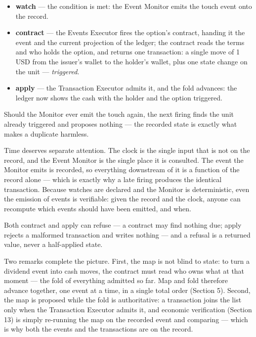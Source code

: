 \documentclass[11pt,a4paper]{article}
\newcommand{\clabel}[1]{\leavevmode\hypertarget{clause-#1}{}%
  \marginpar{\raggedright\scriptsize\ttfamily\textcolor{gray}{#1}}}
\providecommand{\tightlist}{\setlength{\itemsep}{2pt}\setlength{\parskip}{0pt}}
\begin{document}
\begin{itemize}
\tightlist
\item
  \textbf{watch} --- the condition is met: the Event Monitor emits the
  touch event onto the record.
\item
  \textbf{contract} --- the Events Executor fires the option's contract,
  handing it the event and the current projection of the ledger; the
  contract reads the terms and who holds the option, and returns one
  transaction: a single move of 1 USD from the issuer's wallet to the
  holder's wallet, plus one state change on the unit ---
  \emph{triggered}.
\item
  \textbf{apply} --- the Transaction Executor admits it, and the fold
  advances: the ledger now shows the cash with the holder and the option
  triggered.
\end{itemize}

Should the Monitor ever emit the touch again, the next firing finds the
unit already triggered and proposes nothing --- the recorded state is
exactly what makes a duplicate harmless.

Time deserves separate attention. \clabel{C-3.7}The clock is the single input that is
not on the record, and the Event Monitor is the single place it is
consulted. The event the Monitor emits is recorded, so everything
downstream of it is a function of the record alone --- which is exactly
why a late firing produces the identical transaction. Because watches
are declared and the Monitor is deterministic, even the emission of
events is verifiable: given the record and the clock, anyone can
recompute which events should have been emitted, and when.

\clabel{C-3.8}Both contract and apply can refuse --- a contract may find nothing due;
apply rejects a malformed transaction and writes nothing --- and a
refusal is a returned value, never a half-applied state.

Two remarks complete the picture. First, the map is not blind to state:
to turn a dividend event into cash moves, the contract must read who
owns what at that moment --- the fold of everything admitted so far. \clabel{C-3.9}Map
and fold therefore advance together, one event at a time, in a single
total order (Section 5). Second, \clabel{C-3.10}the map is proposed while the fold is
authoritative: a transaction joins the list only when the Transaction
Executor admits it, and economic verification (Section 13) is simply
re-running the map on the recorded event and comparing --- which is why
both the events and the transactions are on the record.
\end{document}
